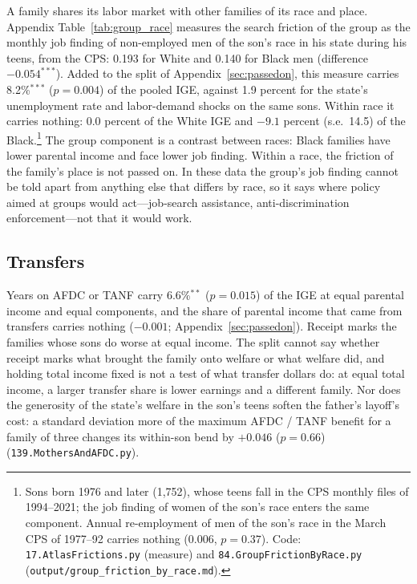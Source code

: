 A family shares its labor market with other families of its race and place. Appendix Table~\ref{tab:group_race} measures the
search friction of the group as the monthly job finding of non-employed men of the son's race in his state during his
teens, from the CPS: 0.193 for White and 0.140 for Black men (difference $-0.054^{***}$). Added to the split of
Appendix~\ref{sec:passedon}, this measure carries 8.2\%$^{***}$ ($p = 0.004$) of the pooled IGE, against 1.9 percent for
the state's unemployment rate and labor-demand shocks on the same sons. Within race it carries nothing: 0.0 percent of
the White IGE and $-9.1$ percent (s.e.\ 14.5) of the Black.\footnote{Sons born 1976 and later (1,752), whose teens fall
in the CPS monthly files of 1994--2021; the job finding of women of the son's race enters the same component. Annual
re-employment of men of the son's race in the March CPS of 1977--92 carries nothing (0.006, $p = 0.37$). Code:
\texttt{17.AtlasFrictions.py} (measure) and \texttt{84.GroupFrictionByRace.py}
(\texttt{output/group\_friction\_by\_race.md}).} The group component is a contrast between races: Black families have
lower parental income and face lower job finding. Within a race, the friction of the family's place is not passed on.
In these data the group's job finding cannot be told apart from anything else that differs by race, so it says where
policy aimed at groups would act---job-search assistance, anti-discrimination enforcement---not that it would work.


\subsection{Transfers}

Years on AFDC or TANF carry 6.6\%$^{**}$ ($p = 0.015$) of the IGE at equal parental income and equal components, and the
share of parental income that came from transfers carries nothing ($-0.001$; Appendix~\ref{sec:passedon}). Receipt marks
the families whose sons do worse at equal income. The split cannot say whether receipt marks what brought the family
onto welfare or what welfare did, and holding total income fixed is not a test of what transfer dollars do: at equal
total income, a larger transfer share is lower earnings and a different family. Nor does the generosity of the
state's welfare in the son's teens soften the father's layoff's cost: a standard deviation more of the maximum
AFDC / TANF benefit for a family of three changes its within-son bend by $+0.046$ ($p = 0.66$)
(\texttt{139.MothersAndAFDC.py}).

